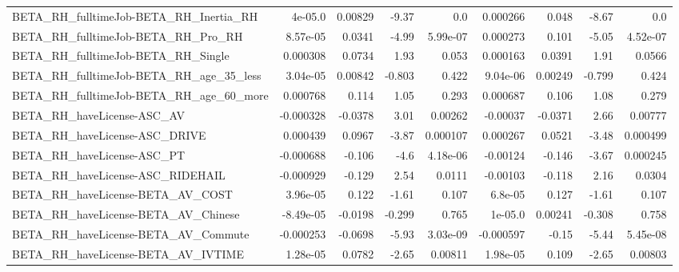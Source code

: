 \begin{tabular}{lrrrrrrrr}
BETA\_RH\_fulltimeJob-BETA\_RH\_Inertia\_RH             &     4e-05.0 &      0.00829 &    -9.37 &      0.0 &   0.000266 &       0.048 &        -8.67 &           0.0 \\
BETA\_RH\_fulltimeJob-BETA\_RH\_Pro\_RH                 &    8.57e-05 &       0.0341 &    -4.99 & 5.99e-07 &   0.000273 &       0.101 &        -5.05 &      4.52e-07 \\
BETA\_RH\_fulltimeJob-BETA\_RH\_Single                 &    0.000308 &       0.0734 &     1.93 &    0.053 &   0.000163 &      0.0391 &         1.91 &        0.0566 \\
BETA\_RH\_fulltimeJob-BETA\_RH\_age\_35\_less            &    3.04e-05 &      0.00842 &   -0.803 &    0.422 &   9.04e-06 &     0.00249 &       -0.799 &         0.424 \\
BETA\_RH\_fulltimeJob-BETA\_RH\_age\_60\_more            &    0.000768 &        0.114 &     1.05 &    0.293 &   0.000687 &       0.106 &         1.08 &         0.279 \\
BETA\_RH\_haveLicense-ASC\_AV                         &   -0.000328 &      -0.0378 &     3.01 &  0.00262 &   -0.00037 &     -0.0371 &         2.66 &       0.00777 \\
BETA\_RH\_haveLicense-ASC\_DRIVE                      &    0.000439 &       0.0967 &    -3.87 & 0.000107 &   0.000267 &      0.0521 &        -3.48 &      0.000499 \\
BETA\_RH\_haveLicense-ASC\_PT                         &   -0.000688 &       -0.106 &     -4.6 & 4.18e-06 &   -0.00124 &      -0.146 &        -3.67 &      0.000245 \\
BETA\_RH\_haveLicense-ASC\_RIDEHAIL                   &   -0.000929 &       -0.129 &     2.54 &   0.0111 &   -0.00103 &      -0.118 &         2.16 &        0.0304 \\
BETA\_RH\_haveLicense-BETA\_AV\_COST                   &    3.96e-05 &        0.122 &    -1.61 &    0.107 &    6.8e-05 &       0.127 &        -1.61 &         0.107 \\
BETA\_RH\_haveLicense-BETA\_AV\_Chinese                &   -8.49e-05 &      -0.0198 &   -0.299 &    0.765 &    1e-05.0 &     0.00241 &       -0.308 &         0.758 \\
BETA\_RH\_haveLicense-BETA\_AV\_Commute                &   -0.000253 &      -0.0698 &    -5.93 & 3.03e-09 &  -0.000597 &       -0.15 &        -5.44 &      5.45e-08 \\
BETA\_RH\_haveLicense-BETA\_AV\_IVTIME                 &    1.28e-05 &       0.0782 &    -2.65 &  0.00811 &   1.98e-05 &       0.109 &        -2.65 &       0.00803 \\

\end{tabular}

